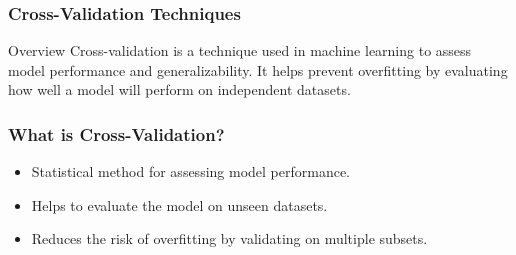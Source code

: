 \documentclass[aspectratio=169]{beamer}
\begin{document}
\begin{frame}[fragile]
    \frametitle{Cross-Validation Techniques}
    \begin{block}{Overview}
        Cross-validation is a technique used in machine learning to assess model performance and generalizability. It helps prevent overfitting by evaluating how well a model will perform on independent datasets.
    \end{block}
\end{frame}

\begin{frame}[fragile]
    \frametitle{What is Cross-Validation?}
    \begin{itemize}
        \item Statistical method for assessing model performance.
        \item Helps to evaluate the model on unseen datasets.
        \item Reduces the risk of overfitting by validating on multiple subsets.
    \end{itemize}
\end{frame}
\end{document}
